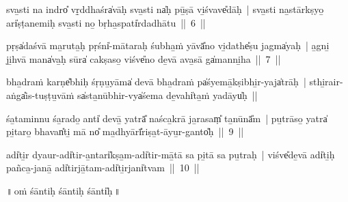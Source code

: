 \documentclass[parskip, DIV=14]{scrartcl}
\begin{document}

sva̱sti na॒ indro̎ vṛ̱ddhaśra̍vāḥ sva̱sti na̍ḥ pū̱ṣā vi̱śvave̎dāḥ~| sva̱sti na̱stārkṣyo̱ ari̍ṣṭanemiḥ sva̱sti no̱ bṛha̱spati̍rdadhātu~||~6~||


pṛṣa̍daśvā ma̱ruta̱ḥ pṛśni̍-mātaraḥ śubha̱ṁ yāvā̎no vi̱dathe̎ṣu jagma̍yaḥ~| a̱gni̱ ji̱hvā mana̍va̱ḥ sūra̍ cakṣaso̱ viśve̎no de̱vā ava̱sā ga̍manni̱ha~||~7~||


bha̱draṁ karṇe̎bhiḥ śṛṇu̱yāma̍ devā bha̱draṁ pa̍śyemā̱kṣibhi̱r-yaja̍trāḥ~| sthi̱rair-aṅga̎is-tuṣṭu̱vāṁ sa̍sta̱nūbhi॒r-vya̍śema de̱vahi̍ta̱ṁ yadāyu̍ḥ~||


śa̱taminnu śa̱rado̱ anti̍ devā̱ yatrā̎ naśca̱krā ja̱rasaṃ̎ ta̱nūnā̎m~| pu̱trāso̱ yatra̍ pi̱taro̱ bhavan̎ti̱ mā no̎ ma̱dhyārī̎riṣa̱t-āyu̱r-ganto̎ḥ~||~9~||


adi̍ti̱r dyaur-adi̍tir-a̱ntari̍kṣa̱m-adi̍tir-mā̱tā sa pi̱tā sa pu̱traḥ~| viśve̎de̱vā adi̍ti̱ḥ pañca̱-janā̱ adi̍tirjā̱tam-adi̍ti̱rjani̍tvam~||~10~||


\vspace{1.0cm}

\centering
 ॥\,oṁ śānti॒ḥ śānti॒ḥ śānti̍ḥ\,॥
 
\Large
\end{document}
